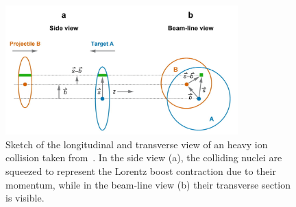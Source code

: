 \begin{figure}[!h]
    \centering
    \includegraphics[width=0.8\textwidth]{gfx/glauber}
	\caption{Sketch of the longitudinal and transverse view of an heavy ion collision taken from~\cite{glauber}. In the side view (a), the colliding nuclei are squeezed to represent the Lorentz boost contraction due to their momentum, while in the beam-line view (b) their transverse section is visible.}
	\label{fig:glauber}
\end{figure}


